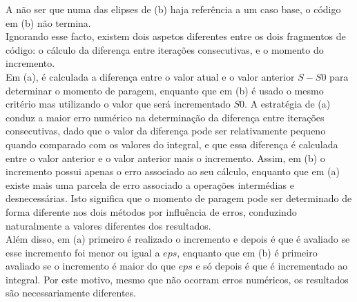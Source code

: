 \documentclass{mnum}
\begin{document}
A não ser que numa das elipses de (b) haja referência a um caso base, o código em (b) não termina.\\
Ignorando esse facto, existem dois aspetos diferentes entre os dois fragmentos de código: o cálculo da diferença entre iterações consecutivas, e o momento do incremento.\\
Em (a), é calculada a diferença entre o valor atual e o valor anterior $S-S0$ para determinar o momento de paragem, enquanto que em (b) é usado o mesmo critério mas utilizando o valor que será incrementado $S0$. A estratégia de (a) conduz a maior erro numérico na determinação da diferença entre iterações consecutivas, dado que o valor da diferença pode ser relativamente pequeno quando comparado com os valores do integral, e que essa diferença é calculada entre o valor anterior e o valor anterior mais o incremento. Assim, em (b) o incremento possui apenas o erro associado ao seu cálculo, enquanto que em (a) existe mais uma parcela de erro associado a operações intermédias e desnecessárias. Isto significa que o momento de paragem pode ser determinado de forma diferente nos dois métodos por influência de erros, conduzindo naturalmente a valores diferentes dos resultados.\\
Além disso, em (a) primeiro é realizado o incremento e depois é que é avaliado se esse incremento foi menor ou igual a $eps$, enquanto que em (b) é primeiro avaliado se o incremento é maior do que $eps$ e só depois é que é incrementado ao integral. Por este motivo, mesmo que não ocorram erros numéricos, os resultados são necessariamente diferentes.
\end{document}
